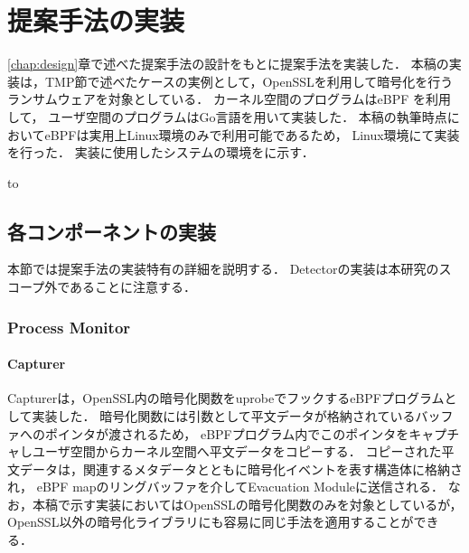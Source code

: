 \chapter{提案手法の実装}
\label{chap:implementation}
\ref{chap:design}章で述べた提案手法の設計をもとに提案手法を実装した．
本稿の実装は，TMP節で述べたケースの実例として，OpenSSLを利用して暗号化を行うランサムウェアを対象としている．
カーネル空間のプログラムはeBPF \cite{WhatiseB81:online} を利用して，
ユーザ空間のプログラムはGo言語を用いて実装した．
本稿の執筆時点においてeBPFは実用上Linux環境のみで利用可能であるため，
Linux環境にて実装を行った．
実装に使用したシステムの環境をに示す．
\begin{table}[t]
  \caption{Implementation environment for the proposed method.}
  \label{tab:impl-env}
  \hbox to
\end{table}

\section{各コンポーネントの実装}
本節では提案手法の実装特有の詳細を説明する．
Detectorの実装は本研究のスコープ外であることに注意する．

\subsection{Process Monitor}
\subsubsection{Capturer}
Capturerは，OpenSSL内の暗号化関数をuprobeでフックするeBPFプログラムとして実装した．
暗号化関数には引数として平文データが格納されているバッファへのポインタが渡されるため，
eBPFプログラム内でこのポインタをキャプチャしユーザ空間からカーネル空間へ平文データをコピーする．
コピーされた平文データは，関連するメタデータとともに暗号化イベントを表す構造体に格納され，
eBPF mapのリングバッファを介してEvacuation Moduleに送信される．
なお，本稿で示す実装においてはOpenSSLの暗号化関数のみを対象としているが，
OpenSSL以外の暗号化ライブラリにも容易に同じ手法を適用することができる．


